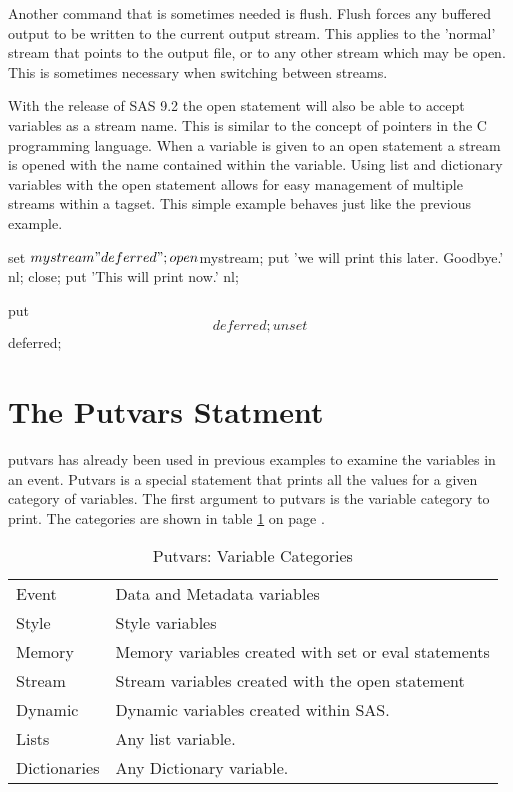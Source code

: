 Another command that is sometimes needed is flush.  Flush forces any buffered output
to be written to the current output stream.  This applies to the 'normal' stream that
points to the output file, or to any other stream which may be open.  
This is sometimes necessary when switching between streams.

With the release of SAS 9.2 the open statement will also be able to accept
variables as a stream name.  This is similar to the concept of pointers in
the C programming language.  When a variable is given to an open statement
a stream is opened with the name contained within the variable.
Using list and dictionary variables with the open statement allows for 
easy management of multiple streams within a tagset. 
This simple example behaves just like the previous example.

\begin{sfvcode}  

     set $mystream "deferred";

     open $mystream;
         put 'we will print this later.  Goodbye.' nl;
     close;
     put 'This will print now.' nl;

     put $$deferred;

     unset $$deferred;

\end{sfvcode}  

\section{The Putvars Statment}
\label{putvars_statement}
putvars has already been used in previous examples to 
examine the variables in an event.
Putvars is a special statement that prints all
the values for a given category of variables.  The first 
argument to putvars is the variable category to print.
The categories are shown in table \ref{Variable Categories}
on page \pageref{Variable Categories}.

\begin{table}\caption{Putvars: Variable Categories}
\label{Variable Categories}
\begin{tabular}{l|l}
\hline
Event &  Data and Metadata variables\\
Style &  Style variables\\
Memory & Memory variables created with set or eval statements\\
Stream & Stream variables created with the open statement\\
Dynamic & Dynamic variables created within SAS. \\
Lists & Any list variable. \\
Dictionaries & Any Dictionary variable.
\end{tabular}
\end{table}

